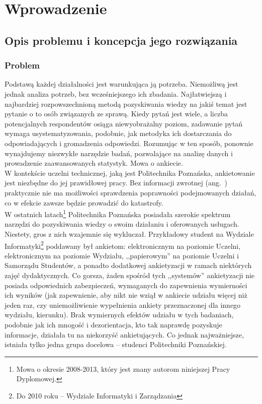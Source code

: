 \chapter{Wprowadzenie}
\label{Chapter1}

\section{Opis problemu i koncepcja jego rozwiązania}
\label{Chapter11}

\subsection{Problem}
Podstawą każdej działalności jest warunkująca ją potrzeba. Niemożliwą jest jednak analiza potrzeb, bez wcześniejszego ich zbadania. Najłatwiejszą i najbardziej rozpowszechnioną metodą pozyskiwania wiedzy na jakiś temat jest pytanie o to osób związanych ze sprawą. Kiedy pytań jest wiele, a liczba potencjalnych respondentów osiąga niewyobrażalny poziom, zadawanie pytań wymaga usystematyzowania, podobnie, jak metodyka ich dostarczania do odpowiadających i gromadzenia odpowiedzi. Rozumując w ten sposób, ponownie wynajdujemy niezwykłe narzędzie badań, pozwalające na analizę danych i prowadzenie zaawansowanych statystyk. Mowa o ankiecie. \\

W kontekście uczelni technicznej, jaką jest Politechnika Poznańska, ankietowanie jest niezbędne do jej prawidłowej pracy. Bez informacji zwrotnej (ang.~) praktycznie nie ma możliwości sprawdzenia poprawności podejmowanych działań, co w efekcie zawsze będzie prowadzić do katastrofy. \\

W ostatnich latach\footnote{Mowa o okresie 2008-2013, który jest znany autorom niniejszej Pracy Dyplomowej.} Politechnika Poznańska posiadała szerokie spektrum narzędzi do pozyskiwania wiedzy o swoim działaniu i oferowanych usługach. Niestety, gros z nich wzajemnie się wykluczał. Przykładowy student na Wydziale Informatyki\footnote{Do 2010 roku -- Wydziale Informatyki i Zarządzania} poddawany był ankietom: elektronicznym na poziomie Uczelni, elektronicznym na poziomie Wydziału, ,,papierowym'' na poziomie Uczelni i Samorządu Studentów, a ponadto dodatkowej ankietyzacji w ramach niektórych zajęć dydaktycznych. Co gorsza, żaden spośród tych ,,systemów'' ankietyzacji nie posiada odpowiednich zabezpieczeń, wymaganych do zapewnienia wymierności ich wyników (jak zapewnienie, aby nikt nie wziął w ankiecie udziału więcej niż jeden raz, czy uniemożliwienie wypełnienia ankiety przeznaczonej dla innego wydziału, kierunku). Brak wymiernych efektów udziału w tych badaniach, podobnie jak ich mnogość i dezorientacja, kto tak naprawdę pozyskuje informacje, działała tu na niekorzyść ankietujących. Co jednak najważniejsze, istniała tylko jedna grupa docelowa -- studenci Politechniki Poznańskiej. \\

